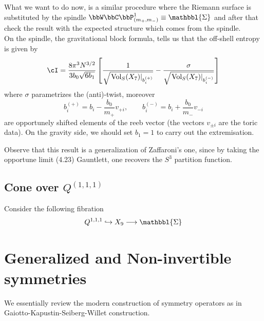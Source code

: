 \documentclass[11pt]{article}
\theoremstyle{definition}
\numberwithin{equation}{section}
\newcommand{\Spindle}{\mathbbl{\Sigma}}
\begin{document}
What we want to do now, is a similar procedure where the Riemann surface is substituted by the spindle $\bbW\bbC\bbP^{1}_{(m_{+},m_{-})}\equiv\Spindle$ and after that check the result with the expected structure which comes from the spindle.\\
On the spindle, the gravitational block formula, tells us that the off-shell entropy is given by
\begin{equation}
	\cI=\frac{8\pi^{3} N^{3/2}}{3b_{0}\sqrt{6b_{1}}}\left[\frac{1}{\sqrt{\left.\text{Vol}_{S}(X_{7})\right|_{b_{i}^{(+)}}}}-\frac{\sigma}{\sqrt{\left.\text{Vol}_{S}(X_{7})\right|_{b_{i}^{(-)}}}}\right]
\end{equation}
where $\sigma$ parametrizes the (anti)-twist, moreover
\begin{equation}
	b_{i}^{(+)}=b_{i}-\frac{b_{0}}{m_{+}}v_{+i},\qquad b_{i}^{(-)}=b_{i}+\frac{b_{0}}{m_{-}}v_{-i}
\end{equation}
are opportunely shifted elements of the reeb vector (the vectors $v_{\pm i}$ are the toric data). On the gravity side, we should set $b_{1}=1$ to carry out the extremisation.

Observe that this result is a generalization of Zaffaroni's one, since by taking the opportune limit (4.23) Gauntlett, one recovers the $S^{3}$ partition function.

\subsection{\texorpdfstring{Cone over $Q^{(1,1,1)}$}{Q111}}
Consider the following fibration
\begin{equation}
	Q^{1,1,1}\hookrightarrow X_{9}\longrightarrow\Spindle
\end{equation}

\section{Generalized and Non-invertible symmetries}
We essentially review the modern construction of symmetry operators as in Gaiotto-Kapustin-Seiberg-Willet construction.
\end{document}
